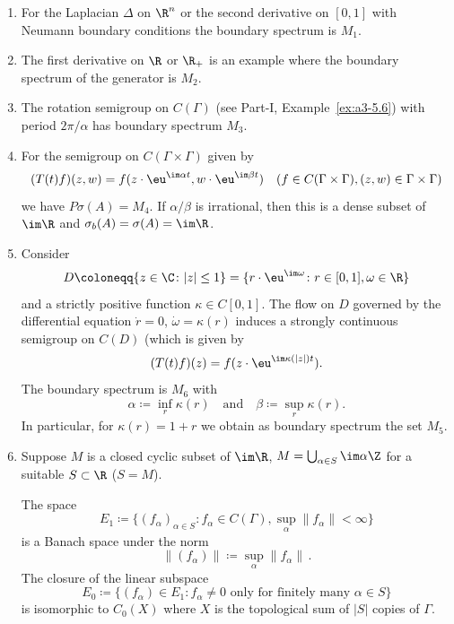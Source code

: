 \begin{examples}\label{ex:b3-2.6}%
\begin{enumerate}[\upshape (i), wide, labelindent=.25em]
\item
For the Laplacian 
 $\Delta$ on $\R^{n}$ or the second derivative on $[0,1]$ with Neumann boundary conditions the boundary spectrum is $M_{1}$.
	
\item
The first derivative on $\R$ or $\R_{+}$ is an example where the boundary spectrum of the generator is $M_{2}$.
	
\item
The rotation semigroup%
 on $C(\Gamma)$ (see Part-I, Example~\ref{ex:a3-5.6}) with period $2\pi/\alpha$ has boundary spectrum $M_{3}$.

\item
For the semigroup on $C(\Gamma \times \Gamma)$ given by
	\[
	(T(t)f)(z,w) = f(z\cdot \eu^{\im\alpha t},w\cdot \eu^{\im\beta  t}) \quad (f \in C(\Gamma \times \Gamma), (z,w) \in \Gamma \times \Gamma)
	\]
	we have $P\sigma(A) = M_{4}$.
	If\/ $\alpha/\beta$ is irrational, then this is a dense subset of\/ $\im \R$ and $\sigma_{b}(A) = \sigma(A) = \im\R$.
	
\item
Consider %
\[
	D \coloneqq \{z \in \C \colon |z| \leq 1\} = \{r\cdot \eu^{\im\omega} \colon r \in [0,1], \omega \in \R\} 
\]
%
and a strictly positive function $\kappa \in C[0,1]$.
The flow on $D$ governed by the differential equation $\dot{r} = 0$, $\dot{\omega} = \kappa(r)$ induces a strongly continuous semigroup on $C(D)$ (which is given by
\[
	(T(t)f)(z) = f(z\cdot \eu^{\im\kappa(|z|)t}).
\]
The boundary spectrum is $M_{6}$ with 
%
\[
	\alpha \coloneqq \inf_r \kappa(r) 
	\quad \text{and} \quad 
	\beta \coloneqq \sup_r \kappa(r).
\]
%
In particular, for $\kappa(r) = 1 + r$ we obtain as boundary spectrum the set $M_{5}$.
	
\item
Suppose $M$ is a closed cyclic subset of\/ $\im \R$, $M = \bigcup_{\alpha \in S} \im\alpha\Z$ for a suitable $S \subset \R$ (\eg $S = M$).
	
The space 
\[
E_{1} \coloneqq \{(f_{\alpha})_{\alpha \in S} \colon f_{\alpha} \in C(\Gamma), \sup_\alpha \|f_{\alpha}\| < \infty\}
\] 
is a Banach space under the norm 
\[
\|(f_{\alpha})\| \coloneqq \sup_\alpha \|f_{\alpha}\|\,.
\]
The closure of the linear subspace 
\[
E_{0} \coloneqq \{(f_{\alpha}) \in E_{1} \colon f_{\alpha} \neq 0 \text{ only for finitely many } \alpha \in S\}
\]
is isomorphic to $C_{0}(X)$ where $X$ is the topological sum of\/ $|S|$ copies of\/ $\Gamma$.
	

\end{enumerate}
\end{examples}
